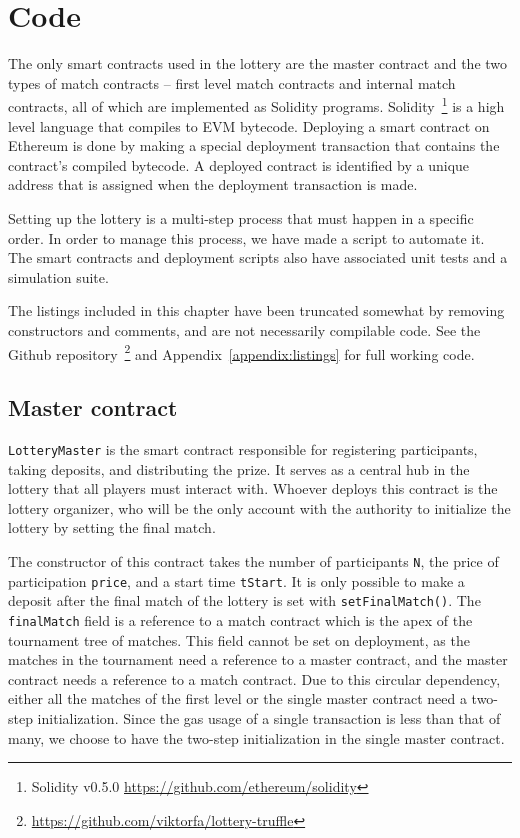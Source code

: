 \section{Code}
\label{sec:code}

The only smart contracts used in the lottery are the master contract and the two types of match contracts – first level match contracts and internal match contracts, all of which are implemented as Solidity programs. Solidity~\footnote{Solidity v0.5.0 \url{https://github.com/ethereum/solidity}} is a high level language that compiles to EVM bytecode. Deploying a smart contract on Ethereum is done by making a special deployment transaction that contains the contract's compiled bytecode. A deployed contract is identified by a unique address that is assigned when the deployment transaction is made.

Setting up the lottery is a multi-step process that must happen in a specific order. In order to manage this process, we have made a script to automate it. The smart contracts and deployment scripts also have associated unit tests and a simulation suite.

The listings included in this chapter have been truncated somewhat by removing constructors and comments, and are not necessarily compilable code. See the Github repository~\footnote{\url{https://github.com/viktorfa/lottery-truffle}} and Appendix~\ref{appendix:listings} for full working code.

\subsection{Master contract}
\texttt{LotteryMaster} is the smart contract responsible for registering participants, taking deposits, and distributing the prize. It serves as a central hub in the lottery that all players must interact with. Whoever deploys this contract is the lottery organizer, who will be the only account with the authority to initialize the lottery by setting the final match. 

The constructor of this contract takes the number of participants \texttt{N}, the price of participation \texttt{price}, and a start time \texttt{tStart}. It is only possible to make a deposit after the final match of the lottery is set with \texttt{setFinalMatch()}. The \texttt{finalMatch} field is a reference to a match contract which is the apex of the tournament tree of matches. This field cannot be set on deployment, as the matches in the tournament need a reference to a master contract, and the master contract needs a reference to a match contract. Due to this circular dependency, either all the matches of the first level or the single master contract need a two-step initialization. Since the gas usage of a single transaction is less than that of many, we choose to have the two-step initialization in the single master contract.


